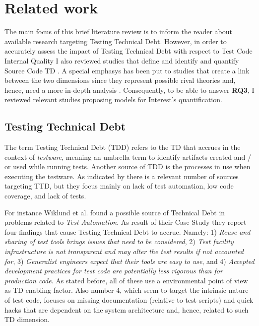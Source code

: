\chapter{Related work} \label{related_work}

The main focus of this brief literature review is to inform the reader about available research targeting Testing Technical Debt. However, in order to accurately assess the impact of Testing Technical Debt with respect to Test Code Internal Quality I also reviewed studies that define and identify and quantify Source Code TD \cite{mapping_study_td}. A special emphasys has been put to studies that create a link between the two dimensions since they represent possible rival theories and, hence, need a more in-depth analysis \cite{case_study_guide}. Consequently, to be able to answer \textbf{RQ3}, I reviewed relevant studies proposing models for Interest's quantification.

\section{Testing Technical Debt} \label{testing_td}

The term Testing Technical Debt (TDD) refers to the TD that accrues in the context of \textit{testware}, meaning an umbrella term to identify artifacts created and / or used while running tests. Another source of TDD is the processes in use when executing the testware. As indicated by \cite{mapping_study_td, exploration_of_td, exploration_of_td2} there is a relevant number of sources targeting TTD, but they focus mainly on lack of test automation, low code coverage, and lack of tests.

For instance Wiklund et al. \cite{test_automation_td} found a possible source of Technical Debt in problems related to \textit{Test Automation}. As result of their Case Study they report four findings that cause Testing Technical Debt to accrue. Namely: 1) \textit{Reuse and sharing of test tools brings issues that need to be considered}, 2) \textit{Test facility infrastructure is not transparent and may alter the test results if not accounted for}, 3) \textit{Generalist engineers expect that their tools are easy to use}, and 4) \textit{Accepted development practices for test code are potentially less rigorous than for production code}. As stated before, all of these use a environmental point of view as TD enabling factor. Also number 4, which seem to target the intrinsic nature of test code, focuses on missing documentation (relative to test scripts) and quick hacks that are dependent on the system architecture and, hence, related to such TD dimension. 

